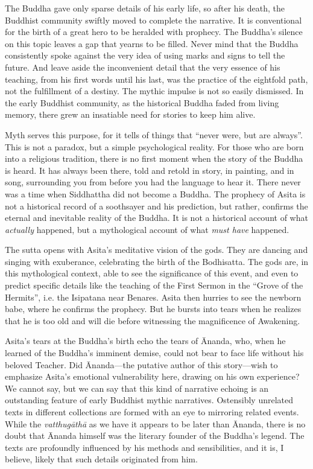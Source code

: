 \documentclass[12pt,openany]{book}%
\begin{document}
The Buddha gave only sparse details of his early life, so after his death, the Buddhist community swiftly moved to complete the narrative. It is conventional for the birth of a great hero to be heralded with prophecy. The Buddha’s silence on this topic leaves a gap that yearns to be filled. Never mind that the Buddha consistently spoke against the very idea of using marks and signs to tell the future. And leave aside the inconvenient detail that the very essence of his teaching, from his first words until his last, was the practice of the eightfold path, not the fulfillment of a destiny. The mythic impulse is not so easily dismissed. In the early Buddhist community, as the historical Buddha faded from living memory, there grew an insatiable need for stories to keep him alive.

Myth serves this purpose, for it tells of things that “never were, but are always”. This is not a paradox, but a simple psychological reality. For those who are born into a religious tradition, there is no first moment when the story of the Buddha is heard. It has always been there, told and retold in story, in painting, and in song, surrounding you from before you had the language to hear it. There never was a time when Siddhattha did not become a Buddha. The prophecy of Asita is not a historical record of a soothsayer and his prediction, but rather, confirms the eternal and inevitable reality of the Buddha. It is not a historical account of what \emph{actually} happened, but a mythological account of what \emph{must have} happened.

The sutta opens with Asita’s meditative vision of the gods. They are dancing and singing with exuberance, celebrating the birth of the Bodhisatta. The gods are, in this mythological context, able to see the significance of this event, and even to predict specific details like the teaching of the First Sermon in the “Grove of the Hermits”, i.e. the Isipatana near Benares. Asita then hurries to see the newborn babe, where he confirms the prophecy. But he bursts into tears when he realizes that he is too old and will die before witnessing the magnificence of Awakening.

Asita’s tears at the Buddha’s birth echo the tears of Ānanda, who, when he learned of the Buddha’s imminent demise, could not bear to face life without his beloved Teacher. Did Ānanda—the putative author of this story—wish to emphasize Asita’s emotional vulnerability here, drawing on his own experience? We cannot say, but we can say that this kind of narrative echoing is an outstanding feature of early Buddhist mythic narratives. Ostensibly unrelated texts in different collections are formed with an eye to mirroring related events. While the \textit{\textsanskrit{vatthugāthā}} as we have it appears to be later than Ānanda, there is no doubt that Ānanda himself was the literary founder of the Buddha’s legend. The texts are profoundly influenced by his methods and sensibilities, and it is, I believe, likely that such details originated from him.
\end{document}
